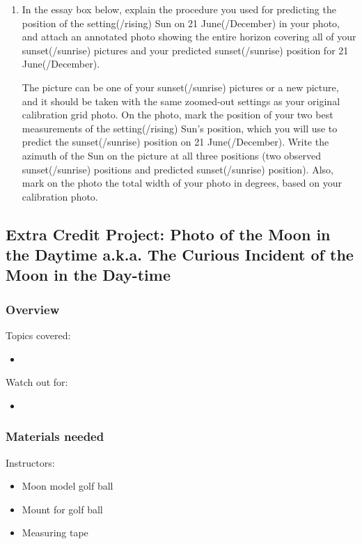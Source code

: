 \documentclass[12pt]{article}
\begin{document}
\begin{enumerate}
\item
In the essay box below, explain the procedure you used for predicting the position of the setting(/rising) Sun on 21 June(/December) in your photo, and attach an annotated photo showing the entire horizon covering all of your sunset(/sunrise) pictures and your predicted sunset(/sunrise) position for 21 June(/December).

The picture can be one of your sunset(/sunrise) pictures or a new picture, and it should be taken with the same zoomed-out settings as your original calibration grid photo. On the photo, mark the position of your two best measurements of the setting(/rising) Sun's position, which you will use to predict the sunset(/sunrise) position on 21 June(/December). Write the azimuth of the Sun on the picture at all three positions (two observed sunset(/sunrise) positions and predicted sunset(/sunrise) position). Also, mark on the photo the total width of your photo in degrees, based on your calibration photo.
\end{enumerate}


\newpage
\subsection{Extra Credit Project: Photo of the Moon in the Daytime a.k.a. The Curious Incident of the Moon in the Day-time}

\subsubsection{Overview}

Topics covered:
\begin{itemize}
\item 
\end{itemize}

\noindent
Watch out for:
\begin{itemize}
\item 
\end{itemize}


\subsubsection{Materials needed}

Instructors:
\begin{itemize}
\item Moon model golf ball
\item Mount for golf ball
\item Measuring tape
\end{itemize}
\end{document}

